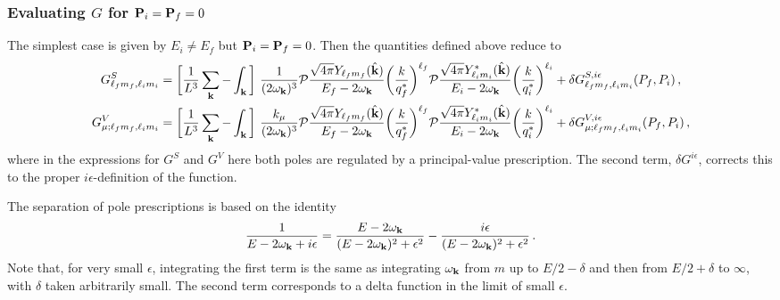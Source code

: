 \subsubsection{Evaluating $G$ for $\textbf P_i = \textbf P_f = 0 $} 


The simplest case is given by $E_i \neq E_f$ but $\textbf P_i = \textbf P_f = 0$. Then the quantities defined above reduce to
\begin{align}
G_{\ell_f m_{f},  \ell_i m_{i}}^S & = \bigg [\frac{1}{L^3}\sum_{\mathbf{k}} - \int_{\textbf k} \bigg]
~\frac{1}{(2\omega_{\textbf k})^3} \mathcal P
\frac{ \sqrt{4 \pi}  Y_{\ell_fm_{ f}}(\hat {\textbf k} )
 }{ E_f - 2 \omega_{\textbf k}     } 
  \bigg (\frac{k }{q^*_{f}} \bigg)^{\ell_f }
\mathcal P \frac{ \sqrt{4 \pi}  
Y^*_{\ell_i m_{i}}(\hat {\textbf k} )
 }{ E_i - 2 \omega_{\textbf k}   } 
 \bigg (\frac{k }{q^*_{i}} \bigg)^{\ell_i } +   \delta G^{S, i \epsilon}_{  \ell_f m_{f},  \ell_i m_{i}}(P_f,P_i)      
  \,, \\
  G_{\mu ; \ell_f m_{f},  \ell_i m_{i}}^V & = \bigg [\frac{1}{L^3}\sum_{\mathbf{k}} - \int_{\textbf k} \bigg]
~\frac{k_\mu}{(2\omega_{\textbf k})^3} \mathcal P
\frac{ \sqrt{4 \pi}  Y_{\ell_fm_{ f}}(\hat {\textbf k} )
 }{ E_f - 2 \omega_{\textbf k}     } 
  \bigg (\frac{k }{q^*_{f}} \bigg)^{\ell_f }
\mathcal P \frac{ \sqrt{4 \pi}  
Y^*_{\ell_i m_{i}}(\hat {\textbf k} )
 }{ E_i - 2 \omega_{\textbf k}   } 
 \bigg (\frac{k }{q^*_{i}} \bigg)^{\ell_i } +   \delta G^{V, i \epsilon}_{ \mu ; \ell_f m_{f},  \ell_i m_{i}}(P_f,P_i)      
  \,,
\end{align}
where in the expressions for $G^S$ and $G^V$ here both poles are regulated by a principal-value prescription. The second term, $\delta G^{i \epsilon}$, corrects this to the proper $i \epsilon$-definition of the function.

The separation of pole prescriptions is based on the identity
\begin{equation}
\frac{1}{E - 2 \omega_{\textbf k} + i \epsilon} = \frac{E - 2 \omega_{\textbf k} }{(E - 2 \omega_{\textbf k})^2 +  \epsilon^2} - \frac{i \epsilon}{(E - 2 \omega_{\textbf k})^2 +  \epsilon^2} \,.
\end{equation}
Note that, for very small $\epsilon$, integrating the first term is the same as integrating $\omega_{\textbf k}$ from $m$ up to $E/2 - \delta$ and then from $E/2+\delta$ to $\infty$, with $\delta$ taken arbitrarily small. The second term corresponds to a delta function in the limit of small $\epsilon$. 

